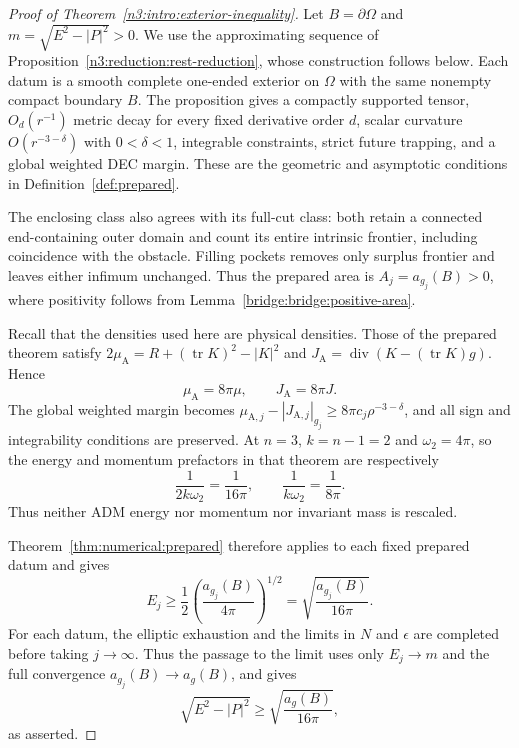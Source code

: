 \label{n3:reduction:prepared-transfer}

\begin{proof}[Proof of Theorem~\ref{n3:intro:exterior-inequality}]
Let $B=\partial\Omega$ and $m=\sqrt{E^2-|P|^2}>0$. We use the
approximating sequence of Proposition~\ref{n3:reduction:rest-reduction},
whose construction follows below. Each datum is a smooth
complete one-ended exterior on $\Omega$ with the same nonempty compact
boundary $B$. The proposition gives a compactly supported tensor,
$O_d(r^{-1})$ metric decay for every fixed derivative order $d$,
scalar curvature $O(r^{-3-\delta})$ with $0<\delta<1$, integrable
constraints, strict future trapping, and a global weighted DEC margin.
These are the geometric and asymptotic conditions in
Definition~\ref{def:prepared}.

The enclosing class also agrees with its full-cut class: both retain
a connected end-containing outer domain and count its entire intrinsic
frontier, including coincidence with the obstacle. Filling pockets
removes only surplus frontier and leaves either infimum unchanged.
Thus the prepared area is $A_j=a_{g_j}(B)>0$, where positivity follows
from Lemma~\ref{bridge:bridge:positive-area}.

Recall that the densities used here are physical densities. Those of
the prepared theorem satisfy
$2\mu_{\mathrm A}=R+(\operatorname{tr}K)^2-|K|^2$ and
$J_{\mathrm A}=\operatorname{div}(K-(\operatorname{tr}K)g)$. Hence
\[
 \mu_{\mathrm A}=8\pi\mu,\qquad J_{\mathrm A}=8\pi J.
\]
The global weighted margin becomes
$\mu_{\mathrm A,j}-|J_{\mathrm A,j}|_{g_j}
\ge8\pi c_j\rho^{-3-\delta}$, and all sign and integrability
conditions are preserved. At $n=3$, $k=n-1=2$ and $\omega_2=4\pi$,
so the energy and momentum prefactors in that theorem are respectively
\[
 \frac1{2k\omega_2}=\frac1{16\pi},\qquad
 \frac1{k\omega_2}=\frac1{8\pi}.
\]
Thus neither ADM energy nor momentum nor invariant mass is rescaled.

Theorem~\ref{thm:numerical:prepared} therefore applies to each fixed
prepared datum and gives
\[
 E_j\ge\frac12\left(\frac{a_{g_j}(B)}{4\pi}\right)^{1/2}
     =\sqrt{\frac{a_{g_j}(B)}{16\pi}}.
\]
For each datum, the elliptic exhaustion and the limits in $N$ and
$\epsilon$ are completed before taking $j\to\infty$. Thus the passage
to the limit uses only $E_j\to m$ and the full convergence
$a_{g_j}(B)\to a_g(B)$, and gives
\[
 \sqrt{E^2-|P|^2}\ge\sqrt{\frac{a_g(B)}{16\pi}},
\]
as asserted.
\end{proof}


